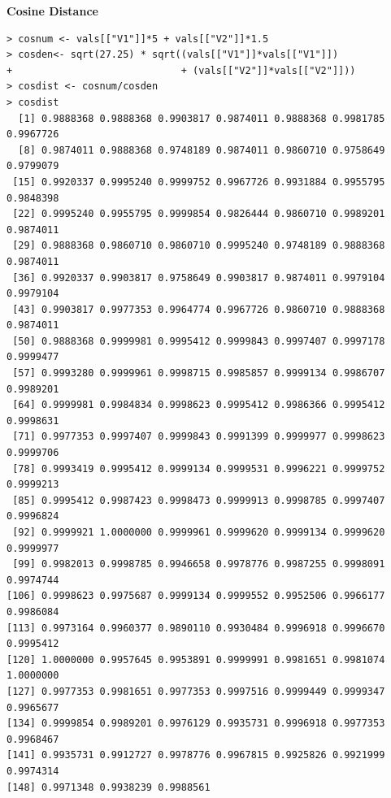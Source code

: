 \documentclass[fontsize=10pt]{scrartcl}
\begin{document}
\begin{enumerate}
\begin{enumerate}
			\textbf{\large Cosine Distance} \\
\begin{verbatim}
> cosnum <- vals[["V1"]]*5 + vals[["V2"]]*1.5
> cosden<- sqrt(27.25) * sqrt((vals[["V1"]]*vals[["V1"]]) 
+                             + (vals[["V2"]]*vals[["V2"]]))
> cosdist <- cosnum/cosden
> cosdist
  [1] 0.9888368 0.9888368 0.9903817 0.9874011 0.9888368 0.9981785 0.9967726
  [8] 0.9874011 0.9888368 0.9748189 0.9874011 0.9860710 0.9758649 0.9799079
 [15] 0.9920337 0.9995240 0.9999752 0.9967726 0.9931884 0.9955795 0.9848398
 [22] 0.9995240 0.9955795 0.9999854 0.9826444 0.9860710 0.9989201 0.9874011
 [29] 0.9888368 0.9860710 0.9860710 0.9995240 0.9748189 0.9888368 0.9874011
 [36] 0.9920337 0.9903817 0.9758649 0.9903817 0.9874011 0.9979104 0.9979104
 [43] 0.9903817 0.9977353 0.9964774 0.9967726 0.9860710 0.9888368 0.9874011
 [50] 0.9888368 0.9999981 0.9995412 0.9999843 0.9997407 0.9997178 0.9999477
 [57] 0.9993280 0.9999961 0.9998715 0.9985857 0.9999134 0.9986707 0.9989201
 [64] 0.9999981 0.9984834 0.9998623 0.9995412 0.9986366 0.9995412 0.9998631
 [71] 0.9977353 0.9997407 0.9999843 0.9991399 0.9999977 0.9998623 0.9999706
 [78] 0.9993419 0.9995412 0.9999134 0.9999531 0.9996221 0.9999752 0.9999213
 [85] 0.9995412 0.9987423 0.9998473 0.9999913 0.9998785 0.9997407 0.9996824
 [92] 0.9999921 1.0000000 0.9999961 0.9999620 0.9999134 0.9999620 0.9999977
 [99] 0.9982013 0.9998785 0.9946658 0.9978776 0.9987255 0.9998091 0.9974744
[106] 0.9998623 0.9975687 0.9999134 0.9999552 0.9952506 0.9966177 0.9986084
[113] 0.9973164 0.9960377 0.9890110 0.9930484 0.9996918 0.9996670 0.9995412
[120] 1.0000000 0.9957645 0.9953891 0.9999991 0.9981651 0.9981074 1.0000000
[127] 0.9977353 0.9981651 0.9977353 0.9997516 0.9999449 0.9999347 0.9965677
[134] 0.9999854 0.9989201 0.9976129 0.9935731 0.9996918 0.9977353 0.9968467
[141] 0.9935731 0.9912727 0.9978776 0.9967815 0.9925826 0.9921999 0.9974314
[148] 0.9971348 0.9938239 0.9988561
\end{verbatim}
			\end{enumerate}
	\end{enumerate}
\end{document}
